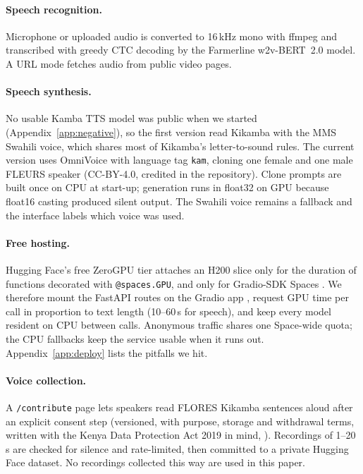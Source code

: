 \documentclass[11pt]{article}
\begin{document}
\paragraph{Speech recognition.} Microphone or uploaded audio is converted to 16\,kHz mono with ffmpeg and transcribed with greedy CTC decoding by the Farmerline w2v-BERT~2.0 model. A URL mode fetches audio from public video pages.

\paragraph{Speech synthesis.} No usable Kamba TTS model was public when we started (Appendix~\ref{app:negative}), so the first version read Kikamba with the MMS Swahili voice, which shares most of Kikamba's letter-to-sound rules. The current version uses OmniVoice with language tag \texttt{kam}, cloning one female and one male FLEURS speaker (CC-BY-4.0, credited in the repository). Clone prompts are built once on CPU at start-up; generation runs in float32 on GPU because float16 casting produced silent output. The Swahili voice remains a fallback and the interface labels which voice was used.

\paragraph{Free hosting.} Hugging Face's free ZeroGPU tier attaches an H200 slice only for the duration of functions decorated with \texttt{@spaces.GPU}, and only for Gradio-SDK Spaces \citep{hf2026zerogpu}. We therefore mount the FastAPI routes on the Gradio app \citep{abid2019gradio}, request GPU time per call in proportion to text length (10--60\,s for speech), and keep every model resident on CPU between calls. Anonymous traffic shares one Space-wide quota; the CPU fallbacks keep the service usable when it runs out. Appendix~\ref{app:deploy} lists the pitfalls we hit.

\paragraph{Voice collection.} A \texttt{/contribute} page lets speakers read FLORES Kikamba sentences aloud after an explicit consent step (versioned, with purpose, storage and withdrawal terms, written with the Kenya Data Protection Act 2019 in mind, \citealp{kenyadpa2019}). Recordings of 1--20\,s are checked for silence and rate-limited, then committed to a private Hugging Face dataset. No recordings collected this way are used in this paper.
\end{document}
